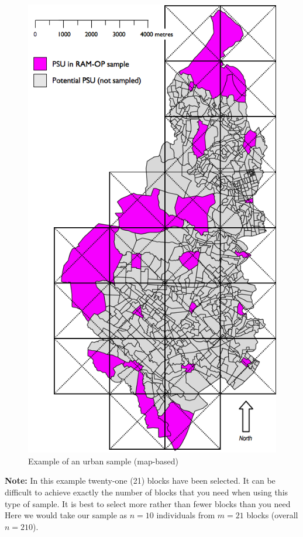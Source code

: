 \documentclass[12pt,a4paper]{book}
\theoremstyle{definition}
\theoremstyle{definition}
\theoremstyle{definition}
\theoremstyle{remark}
\begin{document}
\begin{figure}[H]

{\centering \includegraphics{figures/mapSample5} 

}

\caption{Example of an urban sample (map-based)}\label{fig:sample9}
\end{figure}

\textbf{Note:} In this example twenty-one (21) blocks have been
selected. It can be difficult to achieve exactly the number of blocks
that you need when using this type of sample. It is best to select more
rather than fewer blocks than you need Here we would take our sample as
\(n = 10\) individuals from \(m = 21\) blocks (overall \(n = 210\)).
\end{document}
